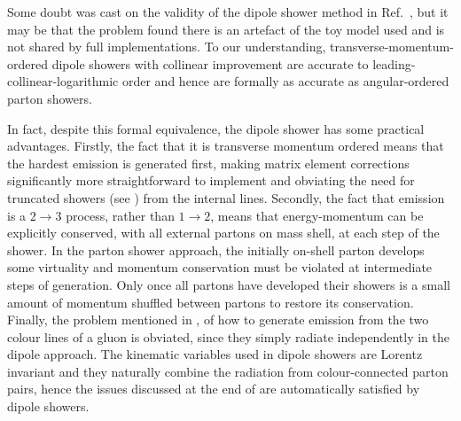 Some doubt was cast on the validity of the dipole shower method in
Ref.~\cite{Dokshitzer:2008ia}, but it may be that the problem found
there is an artefact of the toy model
used \cite{Nagy:2009re,Skands:2009tb} and is not shared by full
implementations.  To our
understanding, transverse-momentum-ordered dipole showers with collinear
improvement are accurate to leading-collinear-logarithmic order and
hence are formally as accurate as angular-ordered parton showers.

In fact, despite this formal equivalence, the dipole shower has some
practical advantages.  Firstly, the fact that it is transverse momentum
ordered means that the hardest emission is generated first, making
matrix element corrections significantly more straightforward to
implement and obviating the need for truncated showers (see
) from the internal lines.  Secondly, the
fact that emission is a $2\to3$ process, rather than $1\to2$, means that
energy-momentum can be explicitly conserved, with all external partons
on mass shell, at each step of the shower.  In the parton shower approach,
the initially on-shell parton develops some virtuality and momentum
conservation must be violated at intermediate steps of generation.  Only
once all partons have developed their showers is a small amount of
momentum shuffled between partons to restore its conservation.  Finally,
the problem mentioned in , of
how to generate emission from the two colour lines of a gluon is
obviated, since they simply radiate independently in the dipole
approach.
The kinematic variables used in dipole showers are Lorentz invariant and
they naturally combine the radiation from colour-connected parton pairs,
hence the issues discussed at the end
of  are automatically satisfied
by dipole showers.

